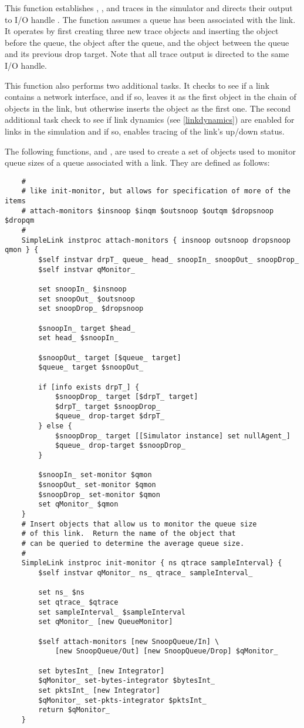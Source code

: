 This function establishes , , and 
traces in the simulator  and directs their
output to I/O handle .
The function assumes a queue has been associated with the link.
It operates by first creating three new trace objects
and inserting the  object before the queue, the
 object after the queue, and the  object
between the queue and its previous drop target.
Note that all trace output is directed to the same I/O handle.

This function also performs two additional tasks.
It checks to see if a link contains a network interface,
and if so, leaves it as the first object in the chain of objects
in the link, but otherwise inserts the  object as
the first one.
The second additional task check to see if link dynamics
(see \ref{linkdynamics}) are enabled for links in the simulation
and if so, enables tracing of the link's up/down status.

The following functions,  and
, are used to create a set of
objects used to monitor queue sizes of a queue associated
with a link.
They are defined as follows:
\begin{small}
\begin{verbatim}
	#
	# like init-monitor, but allows for specification of more of the items
	# attach-monitors $insnoop $inqm $outsnoop $outqm $dropsnoop $dropqm
	#
	SimpleLink instproc attach-monitors { insnoop outsnoop dropsnoop qmon } {
		$self instvar drpT_ queue_ head_ snoopIn_ snoopOut_ snoopDrop_
		$self instvar qMonitor_

		set snoopIn_ $insnoop
		set snoopOut_ $outsnoop
		set snoopDrop_ $dropsnoop

		$snoopIn_ target $head_
		set head_ $snoopIn_

		$snoopOut_ target [$queue_ target]
		$queue_ target $snoopOut_

		if [info exists drpT_] {
			$snoopDrop_ target [$drpT_ target]
			$drpT_ target $snoopDrop_
			$queue_ drop-target $drpT_
		} else {
			$snoopDrop_ target [[Simulator instance] set nullAgent_]
			$queue_ drop-target $snoopDrop_
		}

		$snoopIn_ set-monitor $qmon
		$snoopOut_ set-monitor $qmon
		$snoopDrop_ set-monitor $qmon
		set qMonitor_ $qmon
	}
	# Insert objects that allow us to monitor the queue size
	# of this link.  Return the name of the object that
	# can be queried to determine the average queue size.
	#
	SimpleLink instproc init-monitor { ns qtrace sampleInterval} {
		$self instvar qMonitor_ ns_ qtrace_ sampleInterval_

		set ns_ $ns
		set qtrace_ $qtrace
		set sampleInterval_ $sampleInterval
		set qMonitor_ [new QueueMonitor]

		$self attach-monitors [new SnoopQueue/In] \
			[new SnoopQueue/Out] [new SnoopQueue/Drop] $qMonitor_

		set bytesInt_ [new Integrator]
		$qMonitor_ set-bytes-integrator $bytesInt_
		set pktsInt_ [new Integrator]
		$qMonitor_ set-pkts-integrator $pktsInt_
		return $qMonitor_
	}
\end{verbatim}
\end{small}

